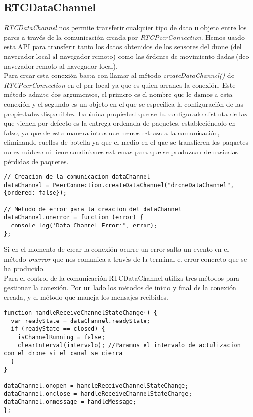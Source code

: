 \subsection{RTCDataChannel}

\emph{RTCDataChannel} nos permite transferir cualquier tipo de dato u objeto entre los pares a través de la comunicación creada por \emph{RTCPeerConnection}. Hemos usado esta API para transferir tanto los datos obtenidos de los sensores del drone (del navegador local al navegador remoto) como las órdenes de movimiento dadas (deo navegador remoto al navegador local).\\

Para crear esta conexión basta con llamar al método \emph{createDataChannel()} de \emph{RTCPeerConnection} en el par local ya que es quien arranca la conexión. Este método admite dos argumentos, el primero es el nombre que le damos a esta conexión y el segundo es un objeto en el que se especifica la configuración de las propiedades disponibles. La única propiedad que se ha configurado distinta de las que vienen por defecto es la entrega ordenada de paquetes, estableciéndolo en falso, ya que de esta manera introduce menos retraso a la comunicación, eliminando cuellos de botella ya que el medio en el que se transfieren los paquetes no es ruidoso ni tiene condiciones extremas para que se produzcan demasiadas pérdidas de paquetes.\\

\begin{lstlisting}[caption=Establecimiento conexión RTCDataChannel en el par local.]
// Creacion de la comunicacion dataChannel
dataChannel = PeerConnection.createDataChannel("droneDataChannel", {ordered: false});

// Metodo de error para la creacion del dataChannel
dataChannel.onerror = function (error) {
  console.log("Data Channel Error:", error);
};\end{lstlisting}

Si en el momento de crear la conexión ocurre un error salta un evento en el método \emph{onerror} que nos comunica a través de la terminal el error concreto que se ha producido.\\

Para el control de la comunicación RTCDataChannel utiliza tres métodos para gestionar la conexión. Por un lado los métodos de inicio y final de la conexión creada, y el método que maneja los mensajes recibidos.\\

\begin{lstlisting}[caption={Manejadores de RTCdataChannel.}, label={lst:manejadoresdatachannel}]
function handleReceiveChannelStateChange() {
  var readyState = dataChannel.readyState;
  if (readyState == closed) {
    isChannelRunning = false;
    clearInterval(intervalo); //Paramos el intervalo de actulizacion con el drone si el canal se cierra
  }
}

dataChannel.onopen = handleReceiveChannelStateChange;
dataChannel.onclose = handleReceiveChannelStateChange;
dataChannel.onmessage = handleMessage;
};\end{lstlisting}


